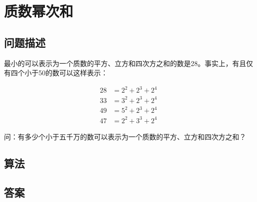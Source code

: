 \section{质数幂次和}
\subsection{问题描述}
\begin{tcolorbox}
	最小的可以表示为一个质数的平方、立方和四次方之和的数是28。事实上，有且仅有四个小于50的数可以这样表示：

	\begin{align*}
		28 & = 2^2 + 2^3 + 2^4 \\
		33 & = 3^2 + 2^3 + 2^4 \\
		49 & = 5^2 + 2^3 + 2^4 \\
		47 & = 2^2 + 3^3 + 2^4
	\end{align*}

	问：有多少个小于五千万的数可以表示为一个质数的平方、立方和四次方之和？
\end{tcolorbox}

\subsection{算法}

\subsection{答案}
